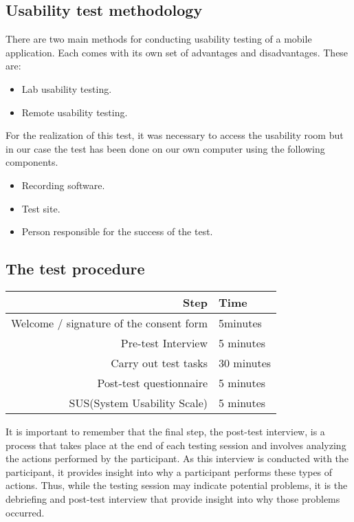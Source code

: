 \documentclass[./main.tex]{subfiles}
\begin{document}
\subsection{Usability test methodology}

There are two main methods for conducting usability testing of a mobile application. Each comes with its own set of advantages and disadvantages. These are:

\begin{itemize}
	\item Lab usability testing.
	\item Remote usability testing.
\end{itemize}

For the realization of this test, it was necessary to access the usability room but in our case the test has been done on our own computer using the following components. 
\begin{itemize}
	\item Recording software.
	\item Test site.
	\item Person responsible for the success of the test.
\end{itemize}


\subsection{The test procedure}{}
\begin{table}[H]
	\centering
\begin{tabular}{r| l}
	\hline
	Step & Time \\ \hline
	Welcome / signature of the consent form & 5minutes \\
	Pre-test Interview & 5 minutes \\ 
	Carry out test tasks & 30 minutes \\ 
	Post-test questionnaire & 5 minutes \\ 
	SUS(System Usability Scale) & 5 minutes \\ \hline
\end{tabular}
\end{table} 
It is important to remember that the final step, the post-test interview, is a process that takes place at the end of each testing session and involves analyzing the actions performed by the participant. As this interview is conducted with the participant, it provides insight into why a participant performs these types of actions. Thus, while the testing session may indicate potential problems, it is the debriefing and post-test interview that provide insight into why those problems occurred.
\end{document}
